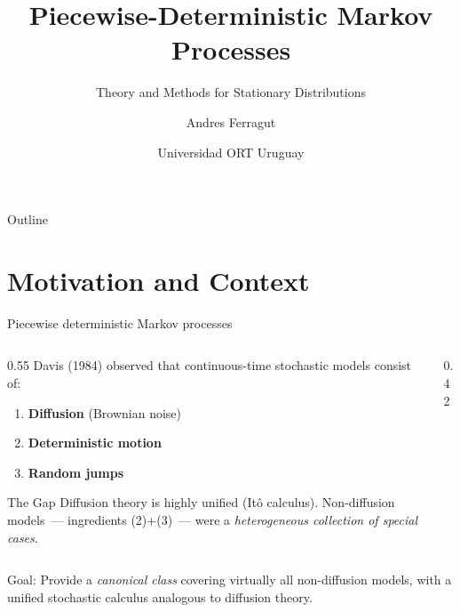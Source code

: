 \documentclass[aspectratio=169]{beamer}
\title[PDMPs: Theory \& Stationary Distributions]{
  Piecewise-Deterministic Markov Processes}
\subtitle{Theory and Methods for Stationary Distributions}
\author[A. Ferragut]{Andres Ferragut}
\date{Universidad ORT Uruguay}
\renewcommand{\phi}{\varphi}
\begin{document}
\begin{frame}
  \titlepage
\end{frame}

\begin{frame}{Outline}
  \tableofcontents
\end{frame}

\section{Motivation and Context}

 \begin{frame}{Piecewise deterministic Markov processes}
   \begin{columns}
     \begin{column}{0.55\textwidth}
       Davis (1984) observed that continuous-time stochastic models consist of:
       \begin{enumerate}
         \item \textbf{Diffusion} (Brownian noise)
         \item \textbf{Deterministic motion}
         \item \textbf{Random jumps}
       \end{enumerate}
       \bigskip
       \begin{block}{The Gap}
         Diffusion theory is highly unified (It\^o calculus).
         Non-diffusion models~--- ingredients (2)+(3)~--- were a
         \emph{heterogeneous collection of special cases}.
       \end{block}
     \end{column}
    \begin{column}{0.42\textwidth}
    \end{column}
  \end{columns}
  \bigskip
  \pause
  \alert{Goal:} Provide a \emph{canonical class} covering virtually all non-diffusion models,
  with a unified stochastic calculus analogous to diffusion theory.
 \end{frame}
\end{document}
